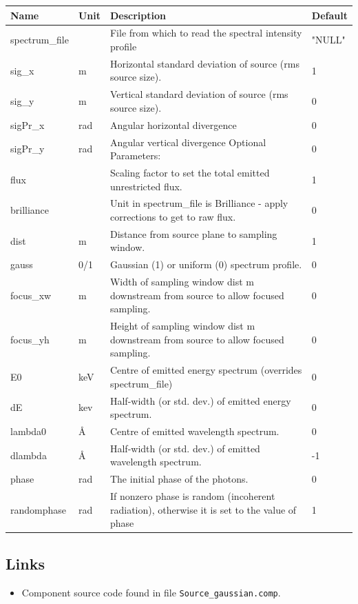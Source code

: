 \begin{longtable}{p{}p{}p{}p{}}
\toprule
\textbf{Name} & \textbf{Unit} & \textbf{Description} & \textbf{Default} \\
\midrule
\endhead
spectrum\_file &   & File from which to read the spectral intensity profile & "NULL" \\
sig\_x & m & Horizontal standard deviation of source (rms source size). & 1 \\
sig\_y & m & Vertical standard deviation of source (rms source size). & 0 \\
sigPr\_x & rad & Angular horizontal divergence & 0 \\
sigPr\_y & rad & Angular vertical divergence Optional Parameters: & 0 \\
flux &  & Scaling factor to set the total emitted unrestricted flux. & 1 \\
brilliance &   & Unit in spectrum\_file is Brilliance - apply corrections to get to raw flux. & 0 \\
dist & m & Distance from source plane to sampling window. & 1 \\
gauss & 0/1 & Gaussian (1) or uniform (0) spectrum profile. & 0 \\
focus\_xw & m & Width of sampling window dist m downstream from source to allow focused sampling. & 0 \\
focus\_yh & m & Height of sampling window dist m downstream from source to allow focused sampling. & 0 \\
E0 & keV & Centre of emitted energy spectrum (overrides spectrum\_file) & 0 \\
dE & kev & Half-width (or std. dev.) of emitted energy spectrum. & 0 \\
lambda0 & \AA{} & Centre of emitted wavelength spectrum. & 0 \\
dlambda & \AA{} & Half-width (or std. dev.) of emitted wavelength spectrum. & -1 \\
phase & rad & The initial phase of the photons. & 0 \\
randomphase & rad & If nonzero phase is random (incoherent radiation), otherwise it is set to the value of phase & 1 \\
\bottomrule
\end{longtable}

\subsection*{Links}
\begin{itemize}
  \item Component source code found in file \texttt{Source\_gaussian.comp}.
\end{itemize}
